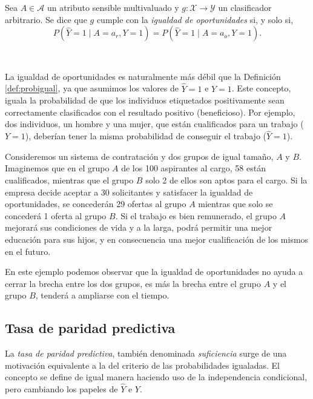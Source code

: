 \documentclass[oneside,openright,titlepage,numbers=noenddot,openany,headinclude,footinclude=true,
cleardoublepage=empty,abstractoff,BCOR=5mm,paper=a4,fontsize=12pt,main=spanish]{scrreprt}
\begin{document}
\begin{definition}
Sea $A \in \mathcal{A}$ un atributo sensible multivaluado y $g\colon \mathcal{X} \to \mathcal{Y}$ un clasificador arbitrario. Se dice que $g$ cumple con la \textit{igualdad de oportunidades} si, y solo si, $$P(\hat{Y}=1 \mid A=a_r,Y=1)=P(\hat{Y}=1 \mid A=a_o, Y=1).$$
\end{definition}\

La igualdad de oportunidades es naturalmente más débil que la Definición \ref{def:probigual}, ya que asumimos los valores de $\hat{Y}=1$ e $Y=1$. Este concepto, iguala la probabilidad de que los individuos etiquetados positivamente
sean correctamente clasificados con el resultado positivo (beneficioso). Por ejemplo, dos individuos, un
hombre y una mujer, que están cualificados para un trabajo ($Y=1$), deberían tener la misma probabilidad de conseguir el trabajo ($\hat{Y}=1$).

\begin{example}
Consideremos un sistema de contratación y dos grupos de igual tamaño, $A$ y $B$. Imaginemos que en el grupo $A$ de los 100 aspirantes al cargo, 58 están cualificados, mientras que el grupo $B$ solo 2 de ellos son aptos para el cargo. Si la empresa decide aceptar a 30 solicitantes y satisfacer la igualdad de oportunidades, se concederán 29 ofertas al grupo $A$ mientras que solo se concederá 1 oferta al grupo $B$. Si el trabajo es bien remunerado, el grupo $A$ mejorará sus condiciones de vida y a la larga, podrá permitir una mejor educación para sus hijos, y en consecuencia una mejor cualificación de los mismos en el futuro. 

En este ejemplo podemos observar que la igualdad de oportunidades no ayuda a cerrar la brecha entre los dos grupos, es más la brecha entre el grupo $A$ y el grupo $B$, tenderá a ampliarse con el tiempo. 
\end{example}

\subsection{Tasa de paridad predictiva}

\label{subsec:suficiencia}

La \textit{tasa de paridad predictiva}, también denominada \textit{suficiencia} surge de una motivación equivalente a la del criterio de las probabilidades igualadas. El concepto se define de igual manera haciendo uso de la independencia condicional, pero cambiando los papeles de $\hat{Y}$ e $Y$. \\
\end{document}

